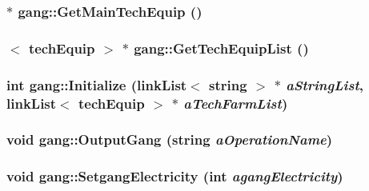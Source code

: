 \label{classgang_a1d704760d4f83677e6214af6a9c79641}
\hypertarget{classgang_ae69e199073ca33ab13840f5009e3ba5e}{
\subsubsection[{GetMainTechEquip}]{ $\ast$ gang::GetMainTechEquip ()}}
\label{classgang_ae69e199073ca33ab13840f5009e3ba5e}
\hypertarget{classgang_ae3744dbd5a9cd0a5ad109317b3f1e339}{
\subsubsection[{GetTechEquipList}]{$<$ {\bf techEquip} $>$ $\ast$ gang::GetTechEquipList ()}}
\label{classgang_ae3744dbd5a9cd0a5ad109317b3f1e339}
\hypertarget{classgang_adbf1bed16c842b8ee84bdbfe03eba946}{
\subsubsection[{Initialize}]{\setlength{\rightskip}{0pt plus 5cm}int gang::Initialize ({\bf linkList}$<$ string $>$ $\ast$ {\em aStringList}, \/  {\bf linkList}$<$ {\bf techEquip} $>$ $\ast$ {\em aTechFarmList})}}
\label{classgang_adbf1bed16c842b8ee84bdbfe03eba946}
\hypertarget{classgang_a3d919f05f8cd6c73a64aa7a6de067870}{
\subsubsection[{OutputGang}]{\setlength{\rightskip}{0pt plus 5cm}void gang::OutputGang (string {\em aOperationName})}}
\label{classgang_a3d919f05f8cd6c73a64aa7a6de067870}
\hypertarget{classgang_aca944833959e462beb2801d5b273a7b9}{
\subsubsection[{SetgangElectricity}]{\setlength{\rightskip}{0pt plus 5cm}void gang::SetgangElectricity (int {\em agangElectricity})}}
